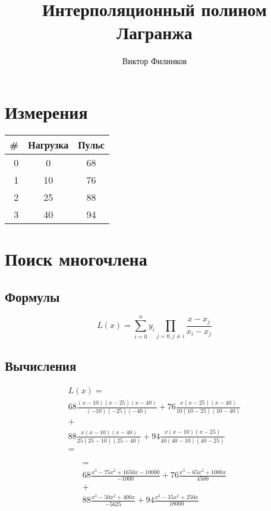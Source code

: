 \documentclass[oneside,final,14pt]{extreport}
\begin{document}
\title{Интерполяционный полином Лагранжа}
\author{Виктор Филинков}
\maketitle

\chapter*{Измерения}
\begin{table}[pht]
	\centering
	\begin{tabular}{|r | c | c|}
		\hline \textbf{\#} &  \textbf{Нагрузка} & \textbf{Пульс} \\ \hline
		0 & 0	&	68	\\ \hline
		1 & 10	&	76	\\ \hline
		2 & 25	&	88	\\ \hline
		3 & 40	&	94	\\ \hline
	\end{tabular}
	\label{measurements}
\end{table}

\chapter*{Поиск многочлена}
\section*{Формулы}

\[
	L(x)=\sum_{i=0}^{n} y_i \prod_{j = 0, j \ne i} \frac{x-x_j}{x_i-x_j}
\]

\section*{Вычисления}
\begin{multline*}
	L(x)= \\
	68 \frac{(x-10)(x-25)(x-40)}{(-10) (-25) (-40)}  + 
	76 \frac{x(x-25)(x-40)}{10(10-25)(10-40)} \\ + \\
	88 \frac{x(x-10)(x-40)}{25(25-10)(25-40)} +
	94 \frac{x(x-10)(x-25)}{40(40-10)(40-25)} \\ = \\
\end{multline*}
\begin{multline*}
	\\ = \\
	68 \frac{x^3-75x^2+1650x-10000}{-1000} + %
	76 \frac{x^3-65x^2+1000x}{4500} \\ + \\
	88 \frac{x^3-50x^2+400x}{-5625} +
	94 \frac{x^3-35x^2+250x}{18000} \\
\end{multline*}
\end{document}
